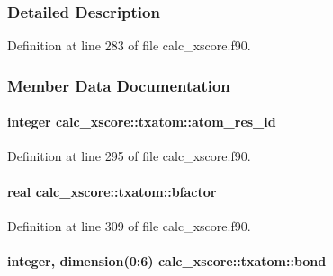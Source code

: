 \subsubsection{Detailed Description}


Definition at line 283 of file calc\-\_\-xscore.\-f90.



\subsubsection{Member Data Documentation}
\hypertarget{structcalc__xscore_1_1txatom_a79b0712d5706daa5474d7b2fc5a9c598}{
\paragraph[{atom\-\_\-res\-\_\-id}]{\setlength{\rightskip}{0pt plus 5cm}integer calc\-\_\-xscore\-::txatom\-::atom\-\_\-res\-\_\-id}}\label{structcalc__xscore_1_1txatom_a79b0712d5706daa5474d7b2fc5a9c598}


Definition at line 295 of file calc\-\_\-xscore.\-f90.

\hypertarget{structcalc__xscore_1_1txatom_af13ea7c6af05c00f717b4cb9682641fe}{
\paragraph[{bfactor}]{\setlength{\rightskip}{0pt plus 5cm}real calc\-\_\-xscore\-::txatom\-::bfactor}}\label{structcalc__xscore_1_1txatom_af13ea7c6af05c00f717b4cb9682641fe}


Definition at line 309 of file calc\-\_\-xscore.\-f90.

\hypertarget{structcalc__xscore_1_1txatom_a86a528bf7bb0773498b6d1721bd75748}{
\paragraph[{bond}]{\setlength{\rightskip}{0pt plus 5cm}integer, dimension(0\-:6) calc\-\_\-xscore\-::txatom\-::bond}}\label{structcalc__xscore_1_1txatom_a86a528bf7bb0773498b6d1721bd75748}


